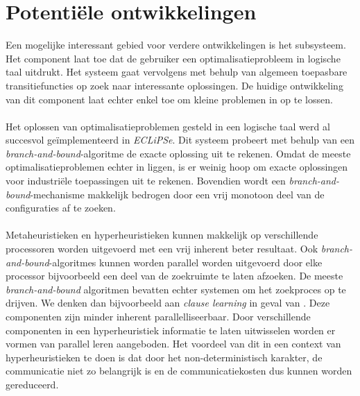 \section{Potenti\"ele ontwikkelingen}

Een mogelijke interessant gebied voor verdere ontwikkelingen is het  subsysteem. Het component laat toe dat de gebruiker een optimalisatieprobleem in logische taal uitdrukt. Het systeem gaat vervolgens met behulp van algemeen toepasbare transitiefuncties op zoek naar interessante oplossingen. De huidige ontwikkeling van dit component laat echter enkel toe om kleine problemen in  op te lossen.

\paragraph{}
Het oplossen van optimalisatieproblemen gesteld in een logische taal werd al succesvol ge\"implementeerd in \emph{ECLiPSe}. Dit systeem probeert met behulp van een \emph{branch-and-bound}-algoritme de exacte oplossing uit te rekenen. Omdat de meeste optimalisatieproblemen echter in  liggen, is er weinig hoop om exacte oplossingen voor industri\"ele toepassingen uit te rekenen. Bovendien wordt een \emph{branch-and-bound}-mechanisme makkelijk bedrogen door een vrij monotoon deel van de configuraties af te zoeken.

\paragraph{}
Metaheuristieken en hyperheuristieken kunnen makkelijk op verschillende processoren worden uitgevoerd met een vrij inherent beter resultaat. Ook \emph{branch-and-bound}-algoritmes kunnen worden parallel worden uitgevoerd door elke processor bijvoorbeeld een deel van de zoekruimte te laten afzoeken. De meeste \emph{branch-and-bound} algoritmen bevatten echter systemen om het zoekproces op te drijven. We denken dan bijvoorbeeld aan \emph{clause learning} in geval van . Deze componenten zijn minder inherent parallelliseerbaar. Door verschillende componenten in een hyperheuristiek informatie te laten uitwisselen worden er vormen van parallel leren aangeboden. Het voordeel van dit in een context van hyperheuristieken te doen is dat door het non-deterministisch  karakter, de communicatie niet zo belangrijk is en de communicatiekosten dus kunnen worden gereduceerd.

